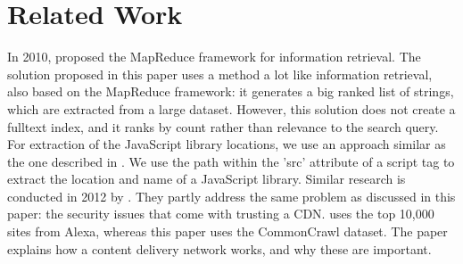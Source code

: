 \section{Related Work}
In 2010, \cite{hiemstra2010mapreduce} proposed the MapReduce framework for information retrieval. The solution proposed in this paper uses a method a lot like information retrieval, also based on the MapReduce framework: it generates a big ranked list of strings, which are extracted from a large dataset. However, this solution does not create a fulltext index, and it ranks by count rather than relevance to the search query.
For extraction of the JavaScript library locations, we use an approach similar as the one described in \cite{muhleisen2012web}. We use the path within the 'src' attribute of a script tag to extract the location and name of a JavaScript library.
Similar research is conducted in 2012 by \cite{nikiforakis2012libraries}. They partly address the same problem as discussed in this paper: the security issues that come with trusting a CDN. \cite{nikiforakis2012libraries} uses the top 10,000 sites from Alexa, whereas this paper uses the CommonCrawl dataset. The paper \cite{bojkovic2011cdn} explains how a content delivery network works, and why these are important.
